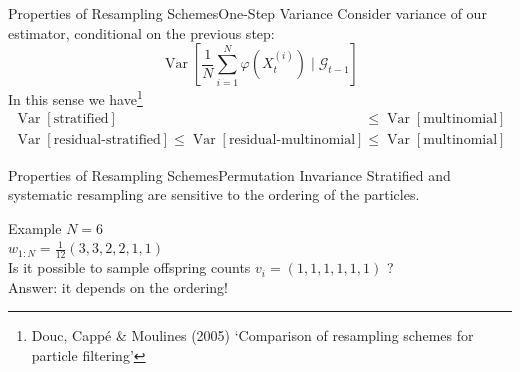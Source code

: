 \documentclass[aspectratio=169]{beamer}
\theoremstyle{definition}
\newcommand{\V}{\operatorname{Var}}
\newcommand{\vt}[1]{v_{#1}}
\newcommand{\wt}[1]{w_{#1}}
\begin{document}
\begin{frame}{Properties of Resampling Schemes}{One-Step Variance}
Consider variance of our estimator, conditional on the previous step:
\begin{equation*}
\V \left[ \frac{1}{N} \sum_{i=1}^N \varphi(X_t^{(i)}) \mid \mathcal{G}_{t-1} \right]
\end{equation*}
\pause
In this sense we have\footnote{Douc, Capp\'e \& Moulines (2005) `Comparison of resampling schemes for particle filtering'}
\begin{align*}
\V[\text{stratified}] &\leq \V[\text{multinomial}] \\
\V[\text{residual-stratified}] \leq \V[\text{residual-multinomial}] &\leq \V[\text{multinomial}]
\end{align*}

\end{frame}


\begin{frame}{Properties of Resampling Schemes}{Permutation Invariance}
Stratified and systematic resampling are sensitive to the ordering of the particles.\\[10pt]
\pause
\begin{block}{Example}
$N=6$\\
$\wt{1:N} = \frac{1}{12}(3,3,2,2,1,1)$\\[7pt]
Is it possible to sample offspring counts $\vt{i} = (1,1,1,1,1,1)$ ?\\[5pt]
\pause
Answer: it depends on the ordering!
\end{block}
%
\end{frame}
\end{document}
